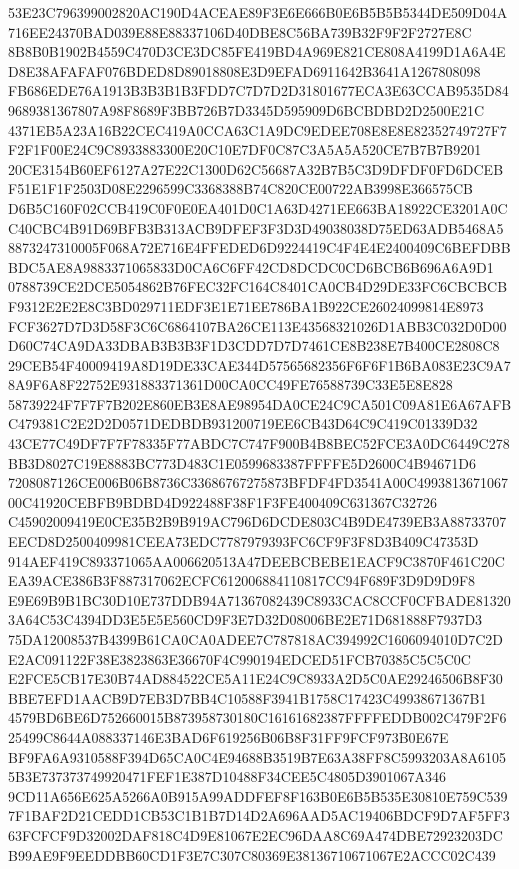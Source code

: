 \documentclass[UTF8,fontset=fandol,zihao=-4,a4paper]{ctexart}
\begin{document}
{{53E23C796399002820AC190D4ACEAE89F3E6E666B0E6B5B5B5344DE509D04A716EE24370BAD039E88E88337106D40DBE8C56BA739B32F9F2F2727E8C
8B8B0B1902B4559C470D3CE3DC85FE419BD4A969E821CE808A4199D1A6A4ED8E38AFAFAF076BDED8D89018808E3D9EFAD6911642B3641A1267808098
FB686EDE76A1913B3B3B1B3FDD7C7D7D2D31801677ECA3E63CCAB9535D849689381367807A98F8689F3BB726B7D3345D595909D6BCBDBD2D2500E21C
4371EB5A23A16B22CEC419A0CCA63C1A9DC9EDEE708E8E8E82352749727F7F2F1F00E24C9C8933883300E20C10E7DF0C87C3A5A5A520CE7B7B7B9201
20CE3154B60EF6127A27E22C1300D62C56687A32B7B5C3D9DFDF0FD6DCEBF51E1F1F2503D08E2296599C3368388B74C820CE00722AB3998E366575CB
D6B5C160F02CCB419C0F0E0EA401D0C1A63D4271EE663BA18922CE3201A0CC40CBC4B91D69BFB3B313ACB9DFEF3F3D3D49038038D75ED63ADB5468A5
8873247310005F068A72E716E4FFEDED6D9224419C4F4E4E2400409C6BEFDBBBDC5AE8A9883371065833D0CA6C6FF42CD8DCDC0CD6BCB6B696A6A9D1
0788739CE2DCE5054862B76FEC32FC164C8401CA0CB4D29DE33FC6CBCBCBF9312E2E2E8C3BD029711EDF3E1E71EE786BA1B922CE26024099814E8973
FCF3627D7D3D58F3C6C6864107BA26CE113E43568321026D1ABB3C032D0D00D60C74CA9DA33DBAB3B3B3F1D3CDD7D7D7461CE8B238E7B400CE2808C8
29CEB54F40009419A8D19DE33CAE344D57565682356F6F6F1B6BA083E23C9A78A9F6A8F22752E931883371361D00CA0CC49FE76588739C33E5E8E828
58739224F7F7F7B202E860EB3E8AE98954DA0CE24C9CA501C09A81E6A67AFBC479381C2E2D2D0571DEDBDB931200719EE6CB43D64C9C419C01339D32
43CE77C49DF7F7F78335F77ABDC7C747F900B4B8BEC52FCE3A0DC6449C278BB3D8027C19E8883BC773D483C1E0599683387FFFFE5D2600C4B94671D6
7208087126CE006B06B8736C33686767275873BFDF4FD3541A00C499381367106700C41920CEBFB9BDBD4D922488F38F1F3FE400409C631367C32726
C45902009419E0CE35B2B9B919AC796D6DCDE803C4B9DE4739EB3A88733707EECD8D2500409981CEEA73EDC7787979393FC6CF9F3F8D3B409C47353D
914AEF419C893371065AA006620513A47DEEBCBEBE1EACF9C3870F461C20CEA39ACE386B3F887317062ECFC612006884110817CC94F689F3D9D9D9F8
E9E69B9B1BC30D10E737DDB94A71367082439C8933CAC8CCF0CFBADE813203A64C53C4394DD3E5E5E560CD9F3E7D32D08006BE2E71D681888F7937D3
75DA12008537B4399B61CA0CA0ADEE7C787818AC394992C1606094010D7C2DE2AC091122F38E3823863E36670F4C990194EDCED51FCB70385C5C5C0C
E2FCE5CB17E30B74AD884522CE5A11E24C9C8933A2D5C0AE29246506B8F30BBE7EFD1AACB9D7EB3D7BB4C10588F3941B1758C17423C49938671367B1
4579BD6BE6D752660015B873958730180C16161682387FFFFEDDB002C479F2F625499C8644A088337146E3BAD6F619256B06B8F31FF9FCF973B0E67E
BF9FA6A9310588F394D65CA0C4E94688B3519B7E63A38FF8C5993203A8A61055B3E737373749920471FEF1E387D10488F34CEE5C4805D3901067A346
9CD11A656E625A5266A0B915A99ADDFEF8F163B0E6B5B535E30810E759C5397F1BAF2D21CEDD1CB53C1B1B7D14D2A696AAD5AC19406BDCF9D7AF5FF3
63FCFCF9D32002DAF818C4D9E81067E2EC96DAA8C69A474DBE72923203DCB99AE9F9EEDDBB60CD1F3E7C307C80369E38136710671067E2ACCC02C439
}}
\end{document}
